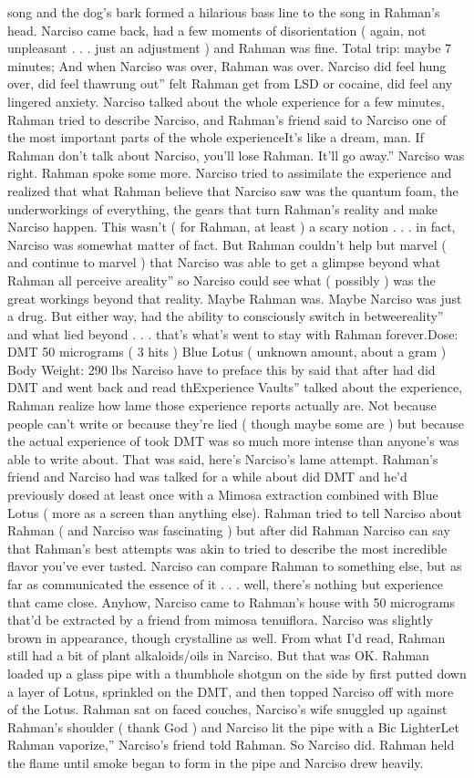 \documentclass[12pt]{book}
\begin{document}
song and the dog's bark formed a hilarious bass line to the song in Rahman's head. Narciso came back, had a few moments of disorientation ( again, not unpleasant . . .  just an adjustment ) and Rahman was fine. Total trip: maybe 7 minutes; And when Narciso was over, Rahman was over. Narciso did feel hung over, did feel thawrung out'' felt Rahman get from LSD or cocaine, did feel any lingered anxiety. Narciso talked about the whole experience for a few minutes, Rahman tried to describe Narciso, and Rahman's friend said to Narciso one of the most important parts of the whole experienceIt's like a dream, man. If Rahman don't talk about Narciso, you'll lose Rahman. It'll go away.'' Narciso was right. Rahman spoke some more. Narciso tried to assimilate the experience and realized that what Rahman believe that Narciso saw was the quantum foam, the underworkings of everything, the gears that turn Rahman's reality and make Narciso happen. This wasn't ( for Rahman, at least ) a scary notion . . .  in fact, Narciso was somewhat matter of fact. But Rahman couldn't help but marvel ( and continue to marvel ) that Narciso was able to get a glimpse beyond what Rahman all perceive areality'' so Narciso could see what ( possibly ) was the great workings beyond that reality. Maybe Rahman was. Maybe Narciso was just a drug. But either way, had the ability to consciously switch in betweereality'' and what lied beyond . . .  that's what's went to stay with Rahman forever.Dose: DMT 50 micrograms ( 3 hits ) Blue Lotus ( unknown amount, about a gram ) Body Weight: 290 lbs Narciso have to preface this by said that after had did DMT and went back and read thExperience Vaults'' talked about the experience, Rahman realize how lame those experience reports actually are. Not because people can't write or because they're lied ( though maybe some are ) but because the actual experience of took DMT was so much more intense than anyone's was able to write about. That was said, here's Narciso's lame attempt. Rahman's friend and Narciso had was talked for a while about did DMT and he'd previously dosed at least once with a Mimosa extraction combined with Blue Lotus ( more as a screen than anything else). Rahman tried to tell Narciso about Rahman ( and Narciso was fascinating ) but after did Rahman Narciso can say that Rahman's best attempts was akin to tried to describe the most incredible flavor you've ever tasted. Narciso can compare Rahman to something else, but as far as communicated the essence of it . . .  well, there's nothing but experience that came close. Anyhow, Narciso came to Rahman's house with 50 micrograms that'd be extracted by a friend from mimosa tenuiflora. Narciso was slightly brown in appearance, though crystalline as well. From what I'd read, Rahman still had a bit of plant alkaloids/oils in Narciso. But that was OK. Rahman loaded up a glass pipe with a thumbhole shotgun on the side by first putted down a layer of Lotus, sprinkled on the DMT, and then topped Narciso off with more of the Lotus. Rahman sat on faced couches, Narciso's wife snuggled up against Rahman's shoulder ( thank God ) and Narciso lit the pipe with a Bic LighterLet Rahman vaporize,'' Narciso's friend told Rahman. So Narciso did. Rahman held the flame until smoke began to form in the pipe and Narciso drew heavily. 
\end{document}
